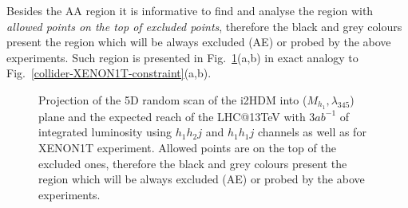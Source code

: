 Besides the AA region it is informative to find and analyse the region
with {\it allowed points on the top of excluded points}, therefore the
black and grey colours
present the region which will be always excluded (AE)
or probed by the above experiments. Such region is presented 
in Fig.~\ref{collider-XENON1T-constraint-AE}(a,b)
in exact analogy to  Fig.~\ref{collider-XENON1T-constraint}(a,b).
%
\begin{figure}[htb]
\vskip -0.5cm
%
\vskip -0.3cm
\caption{Projection of the 5D random scan of the i2HDM into ($M_{h_1},\lambda_{345}$)
plane and the expected  reach of the LHC@13TeV with 3$ab^{-1}$ of integrated luminosity 
using  $h_1 h_2 j$  and  $h_1 h_1 j$ channels as well as for XENON1T experiment.
Allowed points are on the top of the excluded ones, therefore
the black and grey colours
present  the region which will be always excluded (AE)
or probed by the above experiments.
\label{collider-XENON1T-constraint-AE}} 
\end{figure}

